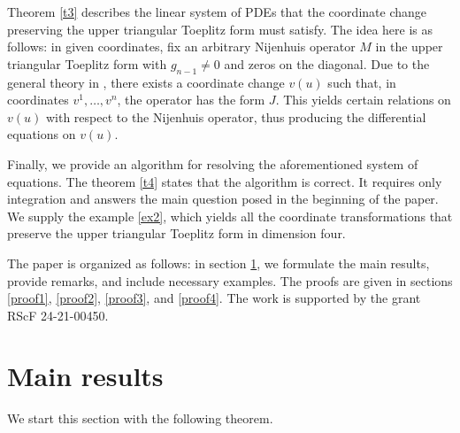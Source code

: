 \documentclass[12pt]{article}
\theoremstyle{remark}
\begin{document}
Theorem \ref{t3} describes the linear system of PDEs that the coordinate change preserving the upper triangular Toeplitz form must satisfy. The idea here is as follows: in given coordinates, fix an arbitrary Nijenhuis operator $M$ in the upper triangular Toeplitz form with $g_{n - 1} \neq 0$ and zeros on the diagonal. Due to the general theory in \cite{nij1}, there exists a coordinate change $v(u)$ such that, in coordinates $v^1, \dots, v^n$, the operator has the form $J$. This yields certain relations on $v(u)$ with respect to the Nijenhuis operator, thus producing the differential equations on $v(u)$.

Finally, we provide an algorithm for resolving the aforementioned system of equations. The theorem \ref{t4} states that the algorithm is correct. It requires only integration and answers the main question posed in the beginning of the paper. We supply the example \eqref{ex2}, which yields all the coordinate transformations that preserve the upper triangular Toeplitz form in dimension four.

The paper is organized as follows: in section \ref{main1}, we formulate the main results, provide remarks, and include necessary examples. The proofs are given in sections \ref{proof1}, \ref{proof2}, \ref{proof3}, and \ref{proof4}. The work is supported by the grant RScF 24-21-00450.


\section{Main results}\label{main1}

We start this section with the following theorem.
\end{document}
